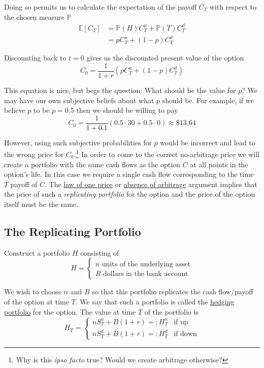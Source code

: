 \documentclass[12pt]{article}
\newlength\tindent
\renewcommand{\indent}{\hspace*{\tindent}}
\renewcommand{\P}{\mathbb P}
\newcommand{\E}{\mathbb E}
\begin{document}
\indent Doing so permits us to calculate the expectation of the payoff $C_T$ with respect to the chosen measure $\P$
\begin{align*}
	\E\left[C_T \right] &= \P(H) C^u_T + \P(T) C^d_T \\
	&= p C^u_T + (1 - p)C^d_T
\end{align*}

Discounting back to $t = 0$ gives us the discounted present value of the option
\begin{equation*}
	C_0 = \frac{1}{1 + r} \left(p C^u_T + (1 - p)C^d_T \right)
\end{equation*}

\indent This equation is nice, but begs the question: What should be the value for $p$? We may have our own subjective beliefs about what $p$ should be. For example, if we believe $p$ to be $p = 0.5$ then we should be willing to pay
\begin{equation*}
	C_0 = \frac{1}{1 + 0.1}\left( 0.5 \cdot 30 + 0.5 \cdot 0 \right) \approx \$ 13.64
\end{equation*}

\indent However, using such subjective probabilities for $p$ would be incorrect and lead to the wrong price for $C_0$.\footnote{Why is this {\em ipso facto} true? Would we create arbitrage otherwise?} In order to come to the correct no-arbitrage price we will create a portfolio with the same cash flows as the option $C$ at all points in the option's life. In this case we require a single cash flow corresponding to the time $T$ payoff of $C$. The \underline{law of one price} or \underline{absence of arbitrage} argument implies that the price of such a {\em replicating portfolio} for the option and the price of the option itself must be the same.

\subsection{The Replicating Portfolio}

Construct a portfolio $H$ consisting of
\begin{equation*}
	H = \begin{cases}
		\text{$n$ units of the underlying asset} \\
		\text{$B$ dollars in the bank account}
	\end{cases}
\end{equation*}

\indent We wish to choose $n$ and $B$ so that this portfolio replicates the cash flow/payoff of the option at time $T$. We say that such a portfolio is called the \underline{hedging portfolio} for the option. The value at time $T$ of the portfolio is
\begin{equation*}
	H_T = 
	\begin{cases}
		n S^u_T + B(1 + r) =: H^u_T & \text{if up} \\
		n S^d_T + B(1 + r) =: H^d_T & \text{if down}
	\end{cases}
\end{equation*}
\end{document}

